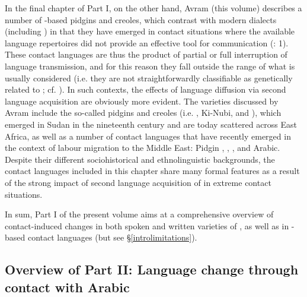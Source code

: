 \documentclass[output=paper]{langsci/langscibook}
\begin{document}
In the final chapter of Part I, on the other hand, Avram (this volume)  describes a number of -based pidgins and creoles, which contrast with modern  dialects (including ) in that they have emerged in contact situations where the available language repertoires did not provide an effective tool for communication (\citealt{BakkerMatras2013intro}: 1). These contact languages are thus the product of partial or full interruption of language {transmission}, and for this reason they fall outside the range of what is usually considered  (i.e. they are not straightforwardly classifiable as genetically related to ; cf. \citealt{McMahon2013}). In such contexts, the effects of language {diffusion} via second language acquisition are obviously more evident. The varieties discussed by Avram include the so-called  pidgins and creoles (i.e.  , Ki-Nubi, and ), which emerged in Sudan in the nineteenth century and are today scattered across East Africa, as well as a number of contact languages that have recently emerged in the context of labour migration to the Middle East:  Pidgin , ,  , and  Arabic. Despite their different sociohistorical and ethnolinguistic backgrounds, the contact languages included in this chapter share many formal features as a result of the strong impact of second language acquisition of  in extreme contact situations.

In sum, Part I of the present volume aims at a comprehensive overview of contact-induced changes in both spoken and written varieties of , as well as in -based contact languages (but see §\ref{introlimitations}).

\subsection{Overview of Part II: Language change through contact
with Arabic}\label{intropartIIoverview}
\end{document}
